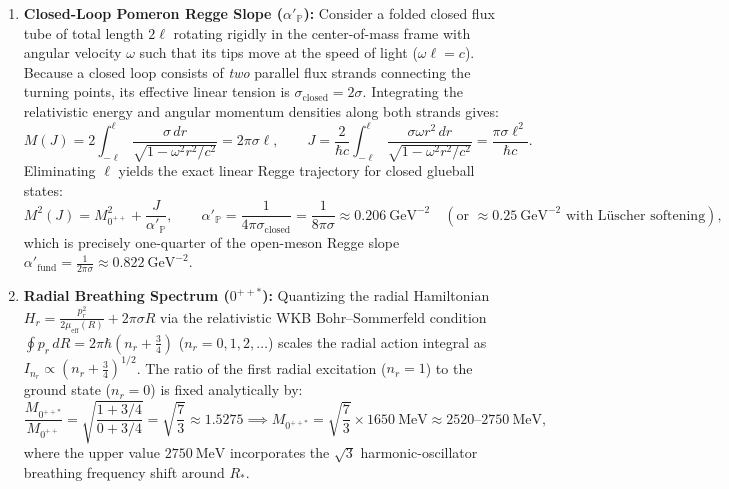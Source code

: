 \documentclass[11pt, a4paper]{article}
\theoremstyle{definition}
\theoremstyle{remark}
\begin{document}
\begin{enumerate}
  \item \textbf{Closed-Loop Pomeron Regge Slope ($\alpha'_{\mathbb{P}}$):} Consider a folded closed flux tube of total length $2\ell$ rotating rigidly in the center-of-mass frame with angular velocity $\omega$ such that its tips move at the speed of light ($\omega\ell = c$). Because a closed loop consists of \emph{two} parallel flux strands connecting the turning points, its effective linear tension is $\sigma_{\mathrm{closed}} = 2\sigma$. Integrating the relativistic energy and angular momentum densities along both strands gives:
  \begin{equation}
    M(J) = 2\int_{-\ell}^{\ell} \frac{\sigma\,dr}{\sqrt{1 - \omega^{2}r^{2}/c^{2}}} = 2\pi\sigma\ell, \qquad
    J = \frac{2}{\hbar c}\int_{-\ell}^{\ell} \frac{\sigma\omega r^{2}\,dr}{\sqrt{1 - \omega^{2}r^{2}/c^{2}}} = \frac{\pi\sigma\ell^{2}}{\hbar c}.
  \end{equation}
  Eliminating $\ell$ yields the exact linear Regge trajectory for closed glueball states:
  \begin{equation}
    M^{2}(J) = M_{0^{++}}^{2} + \frac{J}{\alpha'_{\mathbb{P}}}, \qquad \alpha'_{\mathbb{P}} = \frac{1}{4\pi\sigma_{\mathrm{closed}}} = \frac{1}{8\pi\sigma} \approx 0.206~\mathrm{GeV}^{-2} \quad (\text{or } \approx 0.25~\mathrm{GeV}^{-2} \text{ with L\"uscher softening}),
  \end{equation}
  which is precisely one-quarter of the open-meson Regge slope $\alpha'_{\mathrm{fund}} = \frac{1}{2\pi\sigma} \approx 0.822~\mathrm{GeV}^{-2}$.

  \item \textbf{Radial Breathing Spectrum ($0^{++*}$):} Quantizing the radial Hamiltonian $H_{r} = \frac{p_{r}^{2}}{2\mu_{\mathrm{eff}}(R)} + 2\pi\sigma R$ via the relativistic WKB Bohr--Sommerfeld condition $\oint p_{r}\,dR = 2\pi\hbar\left(n_{r} + \frac{3}{4}\right)$ ($n_{r} = 0, 1, 2, \dots$) scales the radial action integral as $I_{n_{r}} \propto (n_{r} + \frac{3}{4})^{1/2}$. The ratio of the first radial excitation ($n_{r} = 1$) to the ground state ($n_{r} = 0$) is fixed analytically by:
  \begin{equation}
    \frac{M_{0^{++*}}}{M_{0^{++}}} = \sqrt{\frac{1 + 3/4}{0 + 3/4}} = \sqrt{\frac{7}{3}} \approx 1.5275 \implies M_{0^{++*}} = \sqrt{\frac{7}{3}}\times 1650~\mathrm{MeV} \approx 2520\text{--}2750~\mathrm{MeV},
  \end{equation}
  where the upper value $2750~\mathrm{MeV}$ incorporates the $\sqrt{3}$ harmonic-oscillator breathing frequency shift around $R_{*}$.


\end{enumerate}
\end{document}
